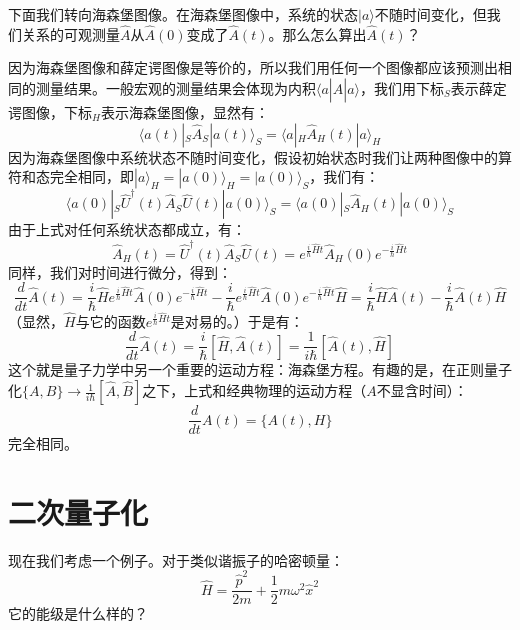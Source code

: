 \documentclass{ctexart}
\begin{document}
下面我们转向海森堡图像。在海森堡图像中，系统的状态$|a\rangle$不随时间变化，但我们关系的可观测量$\hat{A}$从$\hat{A}(0)$变成了$\hat{A}(t)$。那么怎么算出$\hat{A}(t)$？

因为海森堡图像和薛定谔图像是等价的，所以我们用任何一个图像都应该预测出相同的测量结果。一般宏观的测量结果会体现为内积$\langle a|\hat{A}|a\rangle$，我们用下标$_S$表示薛定谔图像，下标$_H$表示海森堡图像，显然有：
\begin{equation}
\langle a(t)|_S\hat{A}_S|a(t)\rangle_S=\langle a|_H\hat{A}_H(t)|a\rangle_H
\end{equation}
因为海森堡图像中系统状态不随时间变化，假设初始状态时我们让两种图像中的算符和态完全相同，即$|a\rangle_H=|a(0)\rangle_H=|a(0)\rangle_S$，我们有：
\begin{equation}
\langle a(0)|_S\hat{U}^\dagger(t)\hat{A}_S\hat{U}(t)|a(0)\rangle_S=\langle a(0)|_S\hat{A}_H(t)|a(0)\rangle_S
\end{equation}
由于上式对任何系统状态都成立，有：
\begin{equation}
\hat{A}_H(t)=\hat{U}^\dagger(t)\hat{A}_S\hat{U}(t)=e^{\frac{i}{\hbar}\hat{H}t}\hat{A}_H(0)e^{-\frac{i}{\hbar}\hat{H}t}
\end{equation}
同样，我们对时间进行微分，得到：
\begin{equation}
\frac{d}{dt}\hat{A}(t)=\frac{i}{\hbar}\hat{H}e^{\frac{i}{\hbar}\hat{H}t}\hat{A}(0)e^{-\frac{i}{\hbar}\hat{H}t}-\frac{i}{\hbar}e^{\frac{i}{\hbar}\hat{H}t}\hat{A}(0)e^{-\frac{i}{\hbar}\hat{H}t}\hat{H}=\frac{i}{\hbar}\hat{H}\hat{A}(t)-\frac{i}{\hbar}\hat{A}(t)\hat{H}
\end{equation}
（显然，$\hat{H}$与它的函数$e^{\frac{i}{\hbar}\hat{H}t}$是对易的。）于是有：
\begin{equation}
\frac{d}{dt}\hat{A}(t)=\frac{i}{\hbar}[\hat{H},\hat{A}(t)]=\frac{1}{i\hbar}[\hat{A}(t),\hat{H}]
\end{equation}
这个就是量子力学中另一个重要的运动方程：海森堡方程。有趣的是，在正则量子化$\{A,B\}\to \frac{1}{i\hbar}[\hat{A},\hat{B}]$之下，上式和经典物理的运动方程（$A$不显含时间）：
\begin{equation}
\frac{d}{dt}A(t)=\{A(t),H\}
\end{equation}
完全相同。

\section{二次量子化}

现在我们考虑一个例子。对于类似谐振子的哈密顿量：
\begin{equation}
\hat{H}=\frac{\hat{p}^2}{2m}+\frac{1}{2}m\omega^2\hat{x}^2
\end{equation}
它的能级是什么样的？
\end{document}
